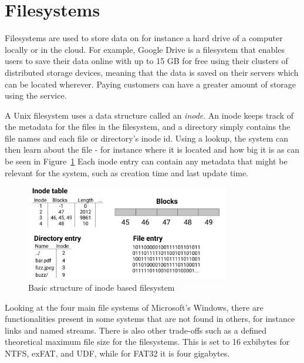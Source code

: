 \section{Filesystems}
Filesystems are used to store data on for instance a hard drive of a computer locally or in the cloud. For example, Google Drive is a filesystem that enables users to save their data online with up to 15 GB for free\cite{CloudStorageWork} using their clusters of distributed storage devices, meaning that the data is saved on their servers which can be located wherever\cite{DistributedStorageWhat}. Paying customers can have a greater amount of storage using the service.

A Unix filesystem uses a data structure called an \textit{inode}. An inode keeps track of the metadata for the files in the filesystem, and a directory simply contains the file names and each file or directory's inode id. Using a lookup, the system can then learn about the file - for instance where it is located and how big it is as can be seen in Figure~\ref{fig:inode_diag} %
Each inode entry can contain any metadata that might be relevant for the system, such as creation time and last update time.

\begin{figure}[!ht]
	\begin{center}
	  \includegraphics[width=0.8\textwidth]{figures/inode_diagram.png}
	\end{center}
	\caption{Basic structure of inode based filesystem}
	\label{fig:inode_diag}
\end{figure}

Looking at the four main file systems of Microsoft's Windows, there are functionalities present in some systems that are not found in others, for instance links and named streams. There is also other trade-offs such as a defined theoretical maximum file size\cite{mikbenFileSystemFunctionality} for the filesystems. This is set to 16 exbibytes for NTFS, exFAT, and UDF, while for FAT32 it is four gigabytes. 

